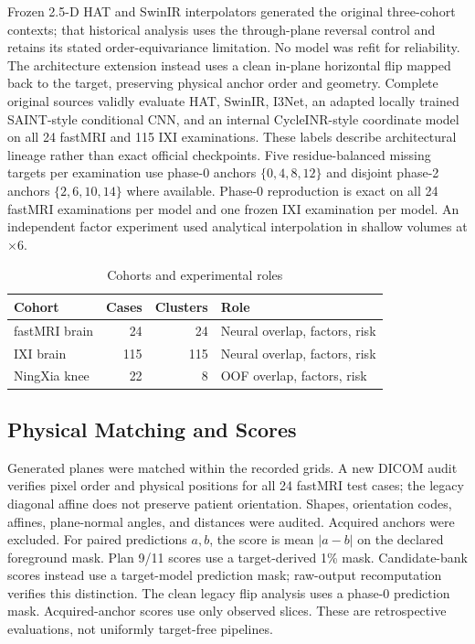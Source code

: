 \documentclass[journal,10pt]{IEEEtran}
\begin{document}
Frozen 2.5-D HAT and SwinIR interpolators generated the original three-cohort contexts; that historical analysis uses the through-plane reversal control and retains its stated order-equivariance limitation. No model was refit for reliability. The architecture extension instead uses a clean in-plane horizontal flip mapped back to the target, preserving physical anchor order and geometry. Complete original sources validly evaluate HAT, SwinIR, I3Net, an adapted locally trained SAINT-style conditional CNN, and an internal CycleINR-style coordinate model on all 24 fastMRI and 115 IXI examinations. These labels describe architectural lineage rather than exact official checkpoints. Five residue-balanced missing targets per examination use phase-0 anchors $\{0,4,8,12\}$ and disjoint phase-2 anchors $\{2,6,10,14\}$ where available. Phase-0 reproduction is exact on all 24 fastMRI examinations per model and one frozen IXI examination per model. An independent factor experiment used analytical interpolation in shallow volumes at $\times6$.

\begin{table}[t]
\caption{Cohorts and experimental roles}
\label{tab:data}\centering
\begin{tabular}{lrrp{3.0cm}}
\toprule
Cohort&Cases&Clusters&Role\\
\midrule
fastMRI brain&24&24&Neural overlap, factors, risk\\
IXI brain&115&115&Neural overlap, factors, risk\\
NingXia knee&22&8&OOF overlap, factors, risk\\
\bottomrule
\end{tabular}
\end{table}

\subsection{Physical Matching and Scores}
Generated planes were matched within the recorded grids. A new DICOM audit verifies pixel order and physical positions for all 24 fastMRI test cases; the legacy diagonal affine does not preserve patient orientation. Shapes, orientation codes, affines, plane-normal angles, and distances were audited. Acquired anchors were excluded. For paired predictions $a,b$, the score is mean $|a-b|$ on the declared foreground mask. Plan 9/11 scores use a target-derived 1\% mask. Candidate-bank scores instead use a target-model prediction mask; raw-output recomputation verifies this distinction. The clean legacy flip analysis uses a phase-0 prediction mask. Acquired-anchor scores use only observed slices. These are retrospective evaluations, not uniformly target-free pipelines.
\end{document}
